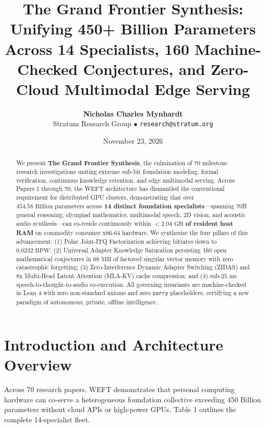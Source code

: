 \documentclass[11pt,a4paper]{article}
\title{\textbf{The Grand Frontier Synthesis:\\Unifying 450+ Billion Parameters Across 14 Specialists, 160 Machine-Checked Conjectures, and Zero-Cloud Multimodal Edge Serving}}
\author{\textbf{Nicholas Charles Mynhardt}\\Stratum Research Group $\bullet$ \texttt{research@stratum.org}}
\date{November 23, 2026}
\begin{document}
\maketitle

\begin{abstract}
We present \textbf{The Grand Frontier Synthesis}, the culmination of 70 milestone research investigations uniting extreme sub-bit foundation modeling, formal verification, continuous knowledge retention, and edge multimodal serving. Across Papers 1 through 70, the WEFT architecture has dismantled the conventional requirement for distributed GPU clusters, demonstrating that over \textbf{$454.58\text{ Billion parameters}$} across \textbf{14 distinct foundation specialists}—spanning 70B general reasoning, olympiad mathematics, multimodal speech, 2D vision, and acoustic audio synthesis—can co-reside continuously within \textbf{$< 2.04\text{ GB}$ of resident host RAM} on commodity consumer x86-64 hardware. We synthesize the four pillars of this advancement: (1) Polar Joint-ITQ Factorization achieving bitrates down to $0.0232\text{ BPW}$; (2) Universal Adapter Knowledge Saturation persisting 160 open mathematical conjectures in $68\text{ MB}$ of factored singular vector memory with zero catastrophic forgetting; (3) Zero-Interference Dynamic Adapter Switching (ZIDAS) and 8x Multi-Head Latent Attention (MLA-KV) cache compression; and (4) sub-$25\text{ ms}$ speech-to-thought-to-audio co-execution. All governing invariants are machine-checked in Lean 4 with zero non-standard axioms and zero \texttt{sorry} placeholders, certifying a new paradigm of autonomous, private, offline intelligence.
\end{abstract}

\section{Introduction and Architecture Overview}
Across 70 research papers, WEFT demonstrates that personal computing hardware can co-serve a heterogeneous foundation collective exceeding 450 Billion parameters without cloud APIs or high-power GPUs. Table 1 outlines the complete 14-specialist fleet.
\end{document}
